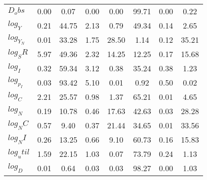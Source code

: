 \begin{center}
\begin{longtable}{lccccccc}
$D_obs     $	 & 	        0.00	 & 	        0.07	 & 	        0.00	 & 	        0.00	 & 	       99.71	 & 	        0.00	 & 	        0.22 \\ 
$log_Y     $	 & 	        0.21	 & 	       44.75	 & 	        2.13	 & 	        0.79	 & 	       49.34	 & 	        0.14	 & 	        2.65 \\ 
$log_Y_N   $	 & 	        0.01	 & 	       33.28	 & 	        1.75	 & 	       28.50	 & 	        1.14	 & 	        0.12	 & 	       35.21 \\ 
$log_SR    $	 & 	        5.97	 & 	       49.36	 & 	        2.32	 & 	       14.25	 & 	       12.25	 & 	        0.17	 & 	       15.68 \\ 
$log_I     $	 & 	        0.32	 & 	       59.34	 & 	        3.12	 & 	        0.38	 & 	       35.24	 & 	        0.38	 & 	        1.23 \\ 
$log_p_I   $	 & 	        0.03	 & 	       93.42	 & 	        5.10	 & 	        0.01	 & 	        0.92	 & 	        0.50	 & 	        0.02 \\ 
$log_C     $	 & 	        2.21	 & 	       25.57	 & 	        0.98	 & 	        1.37	 & 	       65.21	 & 	        0.01	 & 	        4.65 \\ 
$log_N     $	 & 	        0.19	 & 	       10.78	 & 	        0.46	 & 	       17.63	 & 	       42.63	 & 	        0.03	 & 	       28.28 \\ 
$log_NC    $	 & 	        0.57	 & 	        9.40	 & 	        0.37	 & 	       21.44	 & 	       34.65	 & 	        0.01	 & 	       33.56 \\ 
$log_NI    $	 & 	        0.26	 & 	       13.25	 & 	        0.66	 & 	        9.10	 & 	       60.73	 & 	        0.16	 & 	       15.83 \\ 
$log_util  $	 & 	        1.59	 & 	       22.15	 & 	        1.03	 & 	        0.07	 & 	       73.79	 & 	        0.24	 & 	        1.13 \\ 
$log_D     $	 & 	        0.01	 & 	        0.64	 & 	        0.03	 & 	        0.03	 & 	       98.27	 & 	        0.00	 & 	        1.03 \\ 
\end{longtable}
 \end{center}
